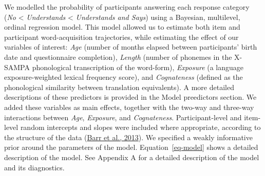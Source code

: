 \documentclass[
]{article}
\begin{document}
We modelled the probability of participants answering each response
category (\emph{No} \textless{} \emph{Understands} \textless{}
\emph{Understands and Says}) using a Bayesian, multilevel, ordinal
regression model. This model allowed us to estimate both item and
participant word-acquisition trajectories, while estimating the effect
of our variables of interest: \emph{Age} (number of months elapsed
between participants' birth date and questionnaire completion),
\emph{Length} (number of phonemes in the X-SAMPA phonological
transcription of the word-form), \emph{Exposure} (a language
exposure-weighted lexical frequency score), and \emph{Cognateness}
(defined as the phonological similarity between translation
equivalents). A more detailed descriptions of these predictors is
provided in the Model preedictors section. We added these variables as
main effects, together with the two-way and three-way interactions
between \emph{Age}, \emph{Exposure}, and \emph{Cognateness}.
Participant-level and item-level random intercepts and slopes were
included where appropriate, according to the structure of the data
(\protect\hyperlink{ref-barr2013random}{Barr et al., 2013}). We
specified a weakly informative prior around the parameters of the model.
Equation~\ref{eq-model} shows a detailed description of the model. See
Appendix A for a detailed description of the model and its diagnostics.
\end{document}
